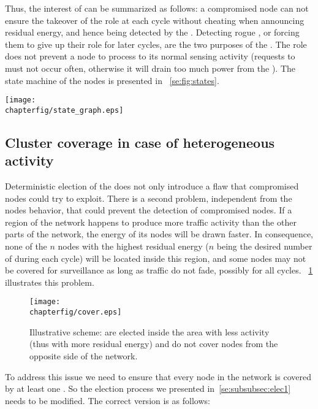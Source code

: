 Thus, the interest of \vns can be summarized as follows: a compromised node can not ensure the takeover of the \cn role at each cycle without cheating when announcing residual energy, and hence being detected by the \vns.
Detecting rogue \cns, or forcing them to give up their role for later cycles, are the two purposes of the \vns.
The \vn role does not prevent a node to process to its normal sensing activity (requests to \cns must not occur often, otherwise it will drain too much power from the \vns).
The state machine of the nodes is presented in \figurename~\ref{se:fig:states}.
\begin{figure*}[ht]
    \centering
    \texttt{[image: \\chapterfig/state\_graph.eps]}
    \caption{State machine of the (non-\CH) nodes}\label{se:fig:states}
\end{figure*}

    \subsection{Cluster coverage in case of heterogeneous activity}

Deterministic election of the \cns does not only introduce a flaw that compromised nodes could try to exploit.
There is a second problem, independent from the nodes behavior, that could prevent the detection of compromised nodes.
If a region of the network happens to produce more traffic activity than the other parts of the network, the energy of its nodes will be drawn faster.
In consequence, none of the $n$ nodes with the highest residual energy ($n$ being the desired number of \cns during each cycle) will be located inside this region, and some nodes may not be covered for surveillance as long as traffic do not fade, possibly for all cycles.
\figurename~\ref{se:fig:cover} illustrates this problem.
\begin{figure}[h]
    \centering
    \texttt{[image: \\chapterfig/cover.eps]}
    \caption{Illustrative scheme: \cns are elected inside the area with less activity (thus with more residual energy) and do not cover nodes from the opposite side of the network.}\label{se:fig:cover}
\end{figure}

To address this issue we need to ensure that every node in the network is covered by at least one \cn.
So the election process we presented in~\ref{se:subsubsec:elec1} needs to be modified.
The correct version is as follows:

